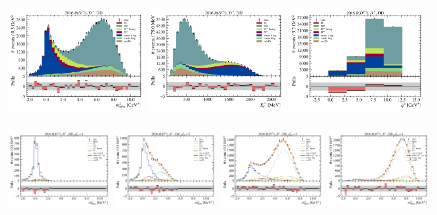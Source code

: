 \begin{figure}[!htb]
    \centering
    \includegraphics[width=0.32\textwidth]{./figs-fit-fit-results/ctrl-fit/stacked/fit_result-stacked-Dst-dd-mmiss2.pdf}
    \includegraphics[width=0.32\textwidth]{./figs-fit-fit-results/ctrl-fit/stacked/fit_result-stacked-Dst-dd-el.pdf}
    \includegraphics[width=0.32\textwidth]{./figs-fit-fit-results/ctrl-fit/stacked/fit_result-stacked-Dst-dd-q2.pdf}

    \includegraphics[width=0.24\textwidth]{./figs-fit-fit-results/ctrl-fit/lines_q2_slices/fit_result-lines_q2_idx1-Dst-dd-mmiss2.pdf}
    \includegraphics[width=0.24\textwidth]{./figs-fit-fit-results/ctrl-fit/lines_q2_slices/fit_result-lines_q2_idx2-Dst-dd-mmiss2.pdf}
    \includegraphics[width=0.24\textwidth]{./figs-fit-fit-results/ctrl-fit/lines_q2_slices/fit_result-lines_q2_idx3-Dst-dd-mmiss2.pdf}
    \includegraphics[width=0.24\textwidth]{./figs-fit-fit-results/ctrl-fit/lines_q2_slices/fit_result-lines_q2_idx4-Dst-dd-mmiss2.pdf}


\end{figure}
